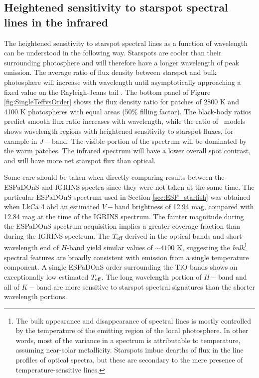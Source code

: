 \documentclass[twocolumn]{emulateapj}%
\begin{document}
\subsection{Heightened sensitivity to starspot spectral lines in the infrared}\label{sec:whyNearIR}

The heightened sensitivity to starspot spectral lines as a function of wavelength can be understood in the following way.  Starspots are cooler than their surrounding photosphere and will therefore have a longer wavelength of peak emission.  The average ratio of flux density between starspot and bulk photosphere will increase with wavelength until asymptotically approaching a fixed value on the Rayleigh-Jeans tail \citep{wolk96}.  The bottom panel of Figure \ref{fig:SingleTeffvsOrder} shows the flux density ratio for patches of 2800 K and 4100 K photospheres with equal areas (50\% filling factor).  The black-body ratios predict smooth flux ratio increases with wavelength, while the ratio of \PHOENIX\ models shows wavelength regions with heightened sensitivity to starspot fluxes, for example in $J-$band.  The visible portion of the spectrum will be dominated by the warm patches.  The infrared spectrum will have a lower overall spot contrast, and will have more net starspot flux than optical.

Some care should be taken when directly comparing results between the ESPaDOnS and IGRINS spectra since they were not taken at the same time.  The particular ESPaDOnS spectrum used in Section \ref{sec:ESP_starfish} was obtained when LkCa 4 ahd an estimated $V-$band brightness of 12.94 mag, compared with 12.84 mag at the time of the IGRINS spectrum.  The fainter magnitude during the ESPaDOnS spectrum acquisition implies a greater coverage fraction than during the IGRINS spectrum.  
The $T_\textrm{eff}$ derived in the optical bands and short-wavelength end of $H$-band yield similar values of $\sim 4100$ K, suggesting the \emph{bulk}\footnote{The bulk appearance and disappearance of spectral lines is mostly controlled by the temperature of the emitting region of the local photosphere.  In other words, most of the variance in a spectrum is attributable to temperature, assuming near-solar metallicity. 
Starspots imbue dearths of flux in the line profiles of optical spectra, but these are secondary to the mere presence of temperature-sensitive lines.} spectral features are broadly consistent with emission from a single temperature component. A single ESPaDOnS order surrounding the TiO bands shows an exceptionally low estimated $T_\textrm{eff}$.  The long wavelength portion of $H-$band and all of $K-$band are more sensitive to starspot spectral signatures than the shorter wavelength portions.
\end{document}

